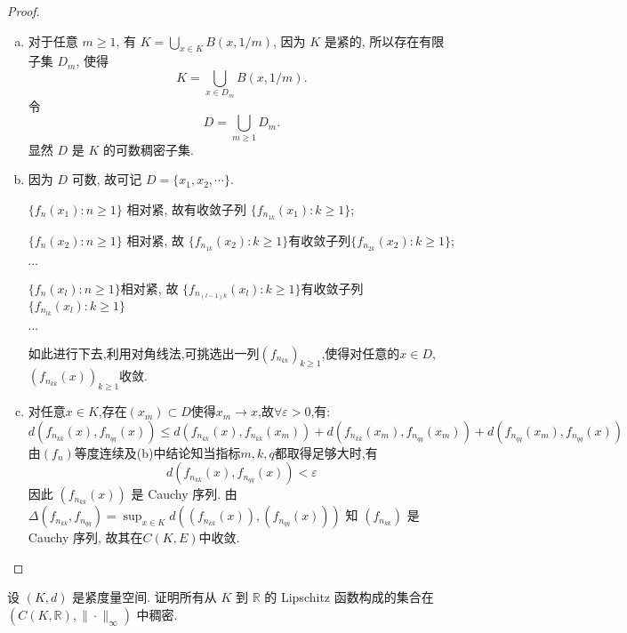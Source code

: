 \begin{proof}
  \begin{enumerate}[(a)]
    \item 对于任意 $m\geq 1$, 有 $K = \bigcup_{x\in K} B(x,1/m)$, 因为 $K$ 是紧的,
      所以存在有限子集 $D_m$, 使得
      \[K = \bigcup_{x\in D_m} B(x,1/m).\]
      令
      \[D = \bigcup_{m\geq 1} D_m.\]
      显然 $D$ 是 $K$ 的可数稠密子集.
    \item 因为 $D$ 可数, 故可记 $D=\{x_1,x_2,\cdots\}$.
      
      $\{f_n(x_1):n\geq 1\}$ 相对紧, 故有收敛子列 $\{f_{n_{1k}}(x_1):k\geq 1\}$;

      $\{f_n(x_2):n\geq 1\}$ 相对紧, 故 $\{f_{n_{1k}}(x_2):k\geq 1\}$有收敛子列$\{f_{n_{2k}}(x_2):k\geq 1\}$;

      $\cdots$

      $\{f_n(x_l):n\geq 1\}$相对紧, 故 $\{f_{n_{(l-1)k}}(x_l):k\geq 1\}$有收敛子列$\{f_{n_{lk}}(x_l):k\geq 1\}$

      $\cdots$

      如此进行下去,利用对角线法,可挑选出一列$(f_{n_{kk}})_{k\geq 1}$,使得对任意的$x\in D$,$(f_{n_{kk}}(x))_{k\geq 1}$收敛.
    \item 对任意$x\in K$,存在$(x_m)\subset D$使得$x_m\to x$,故$\forall\varepsilon>0$,有:
    \[d(f_{n_{kk}}(x),f_{n_{qq}}(x))\leq d(f_{n_{kk}}(x),f_{n_{kk}}(x_m))+d(f_{n_{kk}}(x_m),f_{n_{qq}}(x_m))+d(f_{n_{qq}}(x_m),f_{n_{qq}}(x))\]
    由$(f_n)$等度连续及(b)中结论知当指标$m,k,q$都取得足够大时,有
    \[d(f_{n_{kk}}(x),f_{n_{qq}}(x))<\varepsilon\]
    因此 $(f_{n_{kk}}(x))$ 是 Cauchy 序列.
    由 $\Delta(f_{n_{kk}},f_{n_{qq}}) = \sup_{x\in K}d((f_{n_{kk}}(x)),(f_{n_{qq}}(x)))$
    知 $(f_{n_{kk}})$ 是 Cauchy 序列, 故其在$C(K,E)$中收敛. \qedhere
  \end{enumerate}
  
\end{proof}

\begin{exercise}[10]
    设 $(K,d)$ 是紧度量空间. 证明所有从 $K$ 到 $\mathbb{R}$ 的 Lipschitz 函数构成的集合在 $(C(K,\mathbb{R}),\|\cdot\|_{\infty})$ 中稠密.
\end{exercise}

